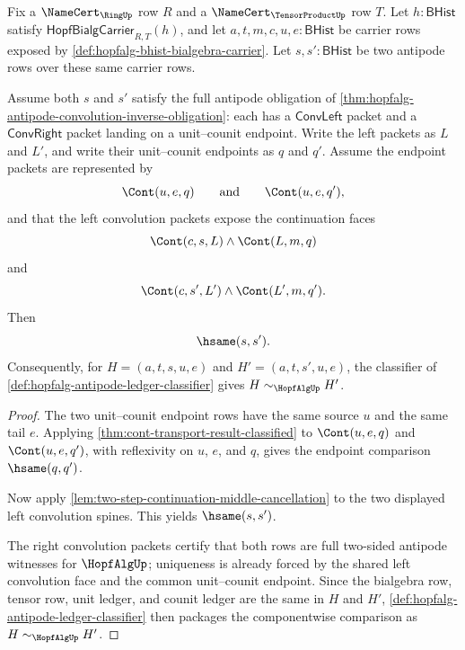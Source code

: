 \begin{theorem}
\label{thm:hopfalg-antipode-convolution-inverse-unique}
Fix a $\NameCert_{\RingUp}$ row $R$ and a $\NameCert_{\TensorProductUp}$ row $T$. Let $h:\mathsf{BHist}$ satisfy $\mathsf{HopfBialgCarrier}_{R,T}(h)$, and let $a,t,m,c,u,e:\mathsf{BHist}$ be carrier rows exposed by \autoref{def:hopfalg-bhist-bialgebra-carrier}. Let $s,s':\mathsf{BHist}$ be two antipode rows over these same carrier rows.

Assume both $s$ and $s'$ satisfy the full antipode obligation of \autoref{thm:hopfalg-antipode-convolution-inverse-obligation}: each has a $\mathsf{ConvLeft}$ packet and a $\mathsf{ConvRight}$ packet landing on a unit--counit endpoint. Write the left packets as $L$ and $L'$, and write their unit--counit endpoints as $q$ and $q'$. Assume the endpoint packets are represented by
$$
\Cont(u,e,q)
\qquad\text{and}\qquad
\Cont(u,e,q'),
$$
and that the left convolution packets expose the continuation faces
$$
\Cont(c,s,L)\land\Cont(L,m,q)
$$
and
$$
\Cont(c,s',L')\land\Cont(L',m,q').
$$
Then
$$
\hsame(s,s').
$$
Consequently, for $H=(a,t,s,u,e)$ and $H'=(a,t,s',u,e)$, the classifier of \autoref{def:hopfalg-antipode-ledger-classifier} gives $H\sim_{\HopfAlgUp}H'$.
\end{theorem}
\begin{proof}
The two unit--counit endpoint rows have the same source $u$ and the same tail $e$. Applying \autoref{thm:cont-transport-result-classified} to $\Cont(u,e,q)$ and $\Cont(u,e,q')$, with reflexivity on $u$, $e$, and $q$, gives the endpoint comparison $\hsame(q,q')$.

Now apply \autoref{lem:two-step-continuation-middle-cancellation} to the two displayed left convolution spines. This yields $\hsame(s,s')$.

The right convolution packets certify that both rows are full two-sided antipode witnesses for $\HopfAlgUp$; uniqueness is already forced by the shared left convolution face and the common unit--counit endpoint. Since the bialgebra row, tensor row, unit ledger, and counit ledger are the same in $H$ and $H'$, \autoref{def:hopfalg-antipode-ledger-classifier} then packages the componentwise comparison as $H\sim_{\HopfAlgUp}H'$.
\end{proof}

